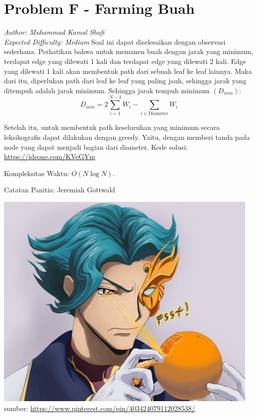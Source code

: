 \section*{Problem F - Farming Buah}
\textit{Author: Muhammad Kamal Shafi}
\\
\textit{Expected Difficulty: Medium}
\newline
\newline
Soal ini dapat diselesaikan dengan observasi sederhana. Perhatikan bahwa untuk memanen buah dengan jarak yang minimum, terdapat edge yang dilewati 1 kali dan terdapat edge yang dilewati 2 kali. Edge yang dilewati 1 kali akan membentuk path dari sebuah leaf ke leaf lainnya. Maka dari itu, diperlukan path dari leaf ke leaf yang paling jauh, sehingga jarak yang ditempuh adalah jarak minimum.
\newline
\newline
Sehingga jarak tempuh minimum $(D_{min})$:
$$ D_{min} = 2 \sum\limits_{i=1}^{N-1} W_i - \sum\limits_{i \in \text{Diameter}} W_i$$

Setelah itu, untuk membentuk path keseluruhan yang minimum secara leksikografis dapat dilakukan dengan greedy. Yaitu, dengan memberi tanda pada node yang dapat menjadi bagian dari diameter.
\newline
\newline
Kode solusi: \url{https://ideone.com/KVeGYm}

Kompleksitas Waktu: $O(N \log N)$.

Catatan Panitia: Jeremiah Gottwald \\

\begin{center}
    \includegraphics[scale=1]{jeremiah.jpg} \\
    sumber: {\footnotesize \url{https://www.pinterest.com/pin/403424079112028538/}}
\end{center}

